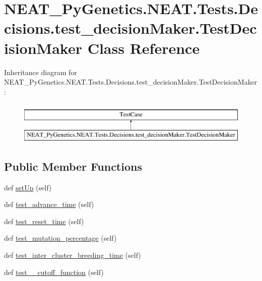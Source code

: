 \hypertarget{classNEAT__PyGenetics_1_1NEAT_1_1Tests_1_1Decisions_1_1test__decisionMaker_1_1TestDecisionMaker}{}\section{N\+E\+A\+T\+\_\+\+Py\+Genetics.\+N\+E\+A\+T.\+Tests.\+Decisions.\+test\+\_\+decision\+Maker.\+Test\+Decision\+Maker Class Reference}
\label{classNEAT__PyGenetics_1_1NEAT_1_1Tests_1_1Decisions_1_1test__decisionMaker_1_1TestDecisionMaker}
Inheritance diagram for N\+E\+A\+T\+\_\+\+Py\+Genetics.\+N\+E\+A\+T.\+Tests.\+Decisions.\+test\+\_\+decision\+Maker.\+Test\+Decision\+Maker\+:\begin{figure}[H]
\begin{center}
\leavevmode
\includegraphics[height=2.000000cm]{classNEAT__PyGenetics_1_1NEAT_1_1Tests_1_1Decisions_1_1test__decisionMaker_1_1TestDecisionMaker}
\end{center}
\end{figure}
\subsection*{Public Member Functions}
\begin{DoxyCompactItemize}
\item 
def \hyperlink{classNEAT__PyGenetics_1_1NEAT_1_1Tests_1_1Decisions_1_1test__decisionMaker_1_1TestDecisionMaker_ae743e3cceb0734c4d2004ce832e19b37}{set\+Up} (self)
\item 
def \hyperlink{classNEAT__PyGenetics_1_1NEAT_1_1Tests_1_1Decisions_1_1test__decisionMaker_1_1TestDecisionMaker_a430c0500eb51d4eb2a829deecc92190b}{test\+\_\+advance\+\_\+time} (self)
\item 
def \hyperlink{classNEAT__PyGenetics_1_1NEAT_1_1Tests_1_1Decisions_1_1test__decisionMaker_1_1TestDecisionMaker_a10ef93cd00575a620e36c175774a8992}{test\+\_\+reset\+\_\+time} (self)
\item 
def \hyperlink{classNEAT__PyGenetics_1_1NEAT_1_1Tests_1_1Decisions_1_1test__decisionMaker_1_1TestDecisionMaker_a67242115e3c1ebb7136d09e1918b6454}{test\+\_\+mutation\+\_\+percentage} (self)
\item 
def \hyperlink{classNEAT__PyGenetics_1_1NEAT_1_1Tests_1_1Decisions_1_1test__decisionMaker_1_1TestDecisionMaker_ab1fceb1b0d9a33d3ede5baad0cf054e0}{test\+\_\+inter\+\_\+cluster\+\_\+breeding\+\_\+time} (self)
\item 
def \hyperlink{classNEAT__PyGenetics_1_1NEAT_1_1Tests_1_1Decisions_1_1test__decisionMaker_1_1TestDecisionMaker_a80e9b89bcdb7044751b2cfb1469e40fd}{test\+\_\+\+\_\+cutoff\+\_\+function} (self)
\end{DoxyCompactItemize}
